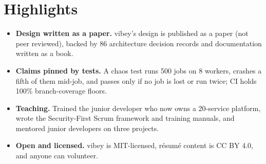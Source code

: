\documentclass[10pt,letterpaper]{article}
\begin{document}
\section*{Highlights}
\begin{itemize}
\item \textbf{Design written as a paper.} vibey's design is published as a paper (not peer reviewed), backed by 86 architecture decision records and documentation written as a book.
\item \textbf{Claims pinned by tests.} A chaos test runs 500 jobs on 8 workers, crashes a fifth of them mid-job, and passes only if no job is lost or run twice; CI holds 100\% branch-coverage floors.
\item \textbf{Teaching.} Trained the junior developer who now owns a 20-service platform, wrote the Security-First Scrum framework and training manuals, and mentored junior developers on three projects.
\item \textbf{Open and licensed.} vibey is MIT-licensed, résumé content is CC BY 4.0, and anyone can volunteer.
\end{itemize}
\end{document}
